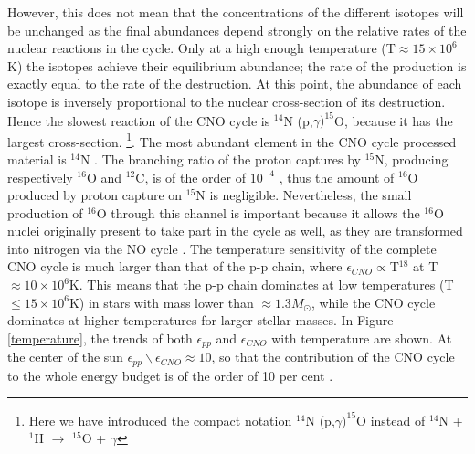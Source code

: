 \vspace{2mm}
However, this does not mean that the concentrations of the different isotopes will be unchanged as the final abundances depend strongly on the relative rates of the nuclear reactions in the cycle. Only at a high enough temperature (T$\approx 15\times10^{6}$K) the isotopes achieve their equilibrium abundance; the rate of the production is exactly equal to the rate of the destruction. At this point, the abundance of each isotope is inversely proportional to the nuclear cross-section of its destruction. Hence the slowest reaction of the CNO cycle is $^{14}$N (p,$\gamma) ^{15}$O, because it has the largest cross-section. \footnote{Here we have introduced the compact notation $^{14}$N (p,$\gamma) ^{15}$O instead of $^{14}$N + $^{1}$H $\longrightarrow$ $^{15}$O + $\gamma$}. The most abundant element in the CNO cycle processed material is $^{14}$N \citep{2016NatSR...622038S}. The branching ratio of the proton captures by $^{15}$N, producing respectively $^{16}$O and $^{12}$C, is of the order of $10^{-4}$ \citep{2018PhP....20..124W}, thus the amount of $^{16}$O produced by proton capture on $^{15}$N is negligible. Nevertheless, the small production of $^{16}$O through this channel is important because it allows the $^{16}$O nuclei originally present to take part in the cycle as well, as they are transformed into nitrogen via the NO cycle \citep{2016NatSR...622038S, 2018PhP....20..124W}. The temperature sensitivity of the complete CNO cycle is much larger than that of the p-p chain, where $\epsilon_{CNO} \propto $T$^{18}$ at T$\approx 10 \times 10^{6}$K. This means that the p-p chain dominates at low temperatures (T$\leq 15 \times 10^{6}$K) in stars with mass lower than $\approx 1.3 M_{\odot}$, while the CNO cycle dominates at higher temperatures for larger stellar masses. In Figure \ref{temperature}, the trends of both $\epsilon_{pp}$ and $\epsilon_{CNO}$ with temperature are shown. At the center of the sun $\epsilon_{pp} \backslash \epsilon_{CNO} \approx
10$, so that the contribution of the CNO cycle to the whole energy budget is of the order of 10 per cent \citep{2011A&A...533A..66C,2016NatSR...622038S,2018PhP....20..124W}.


